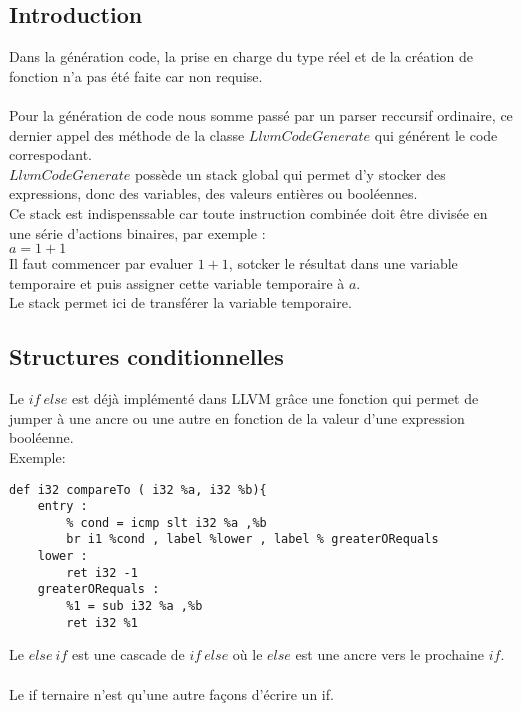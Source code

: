\documentclass[a4paper,10pt]{article}
\begin{document}
\subsection{Introduction}
Dans la génération code, la prise en charge du type réel et de la création de fonction n'a pas été faite car non requise.\\
 \\
Pour la génération de code nous somme passé par un parser reccursif ordinaire, ce dernier appel des méthode de la classe $LlvmCodeGenerate$ qui générent le code correspodant.\\
$LlvmCodeGenerate$ possède un stack global qui permet d'y stocker des expressions, donc des variables, des valeurs entières ou booléennes.\\
Ce stack est indispenssable car toute instruction combinée doit être divisée en une série d'actions binaires, par exemple :\\
$a = 1 + 1$\\
Il faut commencer par evaluer $1 + 1$, sotcker le résultat dans une variable temporaire et puis assigner cette variable temporaire à $a$.\\
Le stack permet ici de transférer la variable temporaire.
\subsection{Structures conditionnelles}
Le $if\ else$ est déjà implémenté dans LLVM grâce une fonction qui permet de jumper à une ancre ou une autre en fonction de la valeur d'une expression booléenne.\\
Exemple:
\begin{verbatim}
def i32 compareTo ( i32 %a, i32 %b){
    entry :
        % cond = icmp slt i32 %a ,%b
        br i1 %cond , label %lower , label % greaterORequals
    lower :
        ret i32 -1
    greaterORequals :
        %1 = sub i32 %a ,%b
        ret i32 %1
\end{verbatim}
Le $else\ if$ est une cascade de $if\ else$ où le $else$ est une ancre vers le prochaine $if$.\\\\
Le if ternaire n'est qu'une autre façons d'écrire un if.
\end{document}
